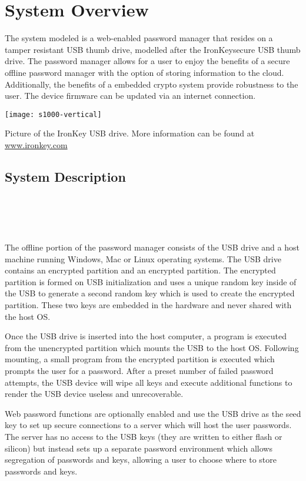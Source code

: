 \chapter{System Overview}
\label{ch:System Overview}
The system modeled is a web-enabled password manager that resides on a
tamper resistant USB thumb drive, modelled after the
IronKey\texttrademark secure USB thumb drive. The password manager
allows for a user to enjoy the benefits of a secure offline password
manager with the option of storing information to the cloud.
Additionally, the benefits of a embedded crypto system provide
robustness to the user.  The device firmware can be updated via an
internet connection.

\begin{marginfigure}%
\centering
  \texttt{[image: s1000-vertical]}
  \caption{Picture of the IronKey USB drive.  More information can be
found at \url{www.ironkey.com}}
  \label{fig:ik}
\end{marginfigure}



\section{System Description}
\label{sec:sysdesc}

\\
\\
\\
\\


The offline portion of the password manager consists of the USB drive
and a host machine running Windows, Mac or Linux operating
systems. The USB drive contains an encrypted partition and an
encrypted partition.  The encrypted partition is formed on USB
initialization and uses a unique random key inside of the USB to
generate a second random key which is used to create the encrypted
partition. These two keys are embedded in the hardware and never
shared with the host OS.
\par Once the USB drive is inserted into the host computer, a program
is executed from the unencrypted partition which mounts the USB to the
host OS.  Following mounting, a small program from the encrypted
partition is executed which prompts the user for a password. After a
preset number of failed password attempts, the USB device will wipe
all keys and execute additional functions to render the USB device
useless and unrecoverable.
\par Web password functions are optionally enabled and use the USB
drive as the seed key to set up secure connections to a server which
will host the user passwords.  The server has no access to the USB
keys (they are written to either flash or silicon) but instead sets up
a separate password environment which allows segregation of passwords
and keys, allowing a user to choose where to store passwords and keys.

